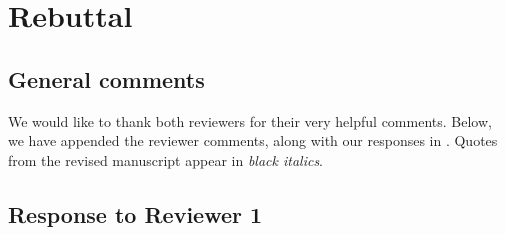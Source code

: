 % 
% 
% 
% 
% 
% 

\section*{Rebuttal} %
\label{sec:general_rebuttal}


\setcounter{subsection}{0}
\subsection*{General comments} %
\label{sub:general_comments}

We would like to thank both reviewers for their very helpful comments.  Below, we have appended the reviewer comments, along with our responses in .  Quotes from the revised manuscript appear in \emph{black italics}.

\subsection{Response to Reviewer 1} %
\label{sec:response_to_reviewer_1}



